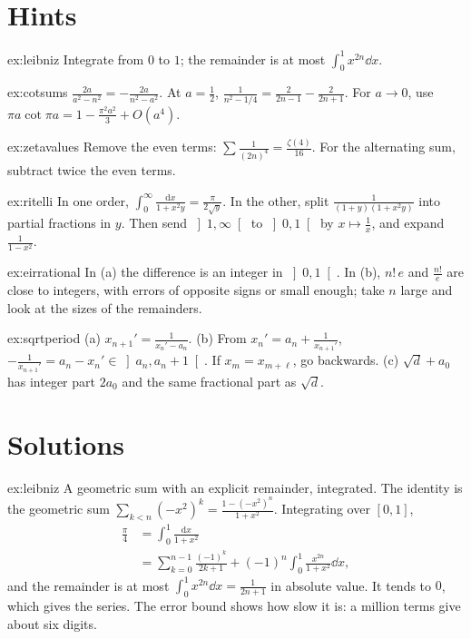 \section{Hints}

\begin{hint}{ex:leibniz}
Integrate from $0$ to $1$; the remainder is at most $\int_0^1x^{2n}\dd x$.
\end{hint}
\begin{hint}{ex:cotsums}
$\frac{2a}{a^2-n^2}=-\frac{2a}{n^2-a^2}$. At $a=\frac12$, $\frac1{n^2-1/4}=\frac2{2n-1}-\frac2{2n+1}$. For $a\to0$, use
$\pi a\cot\pi a=1-\frac{\pi^2a^2}3+O(a^4)$.
\end{hint}
\begin{hint}{ex:zetavalues}
Remove the even terms: $\sum\frac1{(2n)^4}=\frac{\zeta(4)}{16}$. For the alternating sum, subtract twice the even terms.
\end{hint}
\begin{hint}{ex:ritelli}
In one order, $\int_0^\infty\frac{\mathrm dx}{1+x^2y}=\frac\pi{2\sqrt y}$. In the other, split
$\frac1{(1+y)(1+x^2y)}$ into partial fractions in $y$. Then send $\left]1,\infty\right[$ to $\left]0,1\right[$ by $x\mapsto\frac1x$, and expand
$\frac1{1-x^2}$.
\end{hint}
\begin{hint}{ex:eirrational}
In (a) the difference is an integer in $\left]0,1\right[$. In (b), $n!\,e$ and $\frac{n!}e$ are close to integers, with errors of
opposite signs or small enough; take $n$ large and look at the sizes of the remainders.
\end{hint}
\begin{hint}{ex:sqrtperiod}
(a) $x_{n+1}'=\frac1{x_n'-a_n}$. (b) From $x_n'=a_n+\frac1{x_{n+1}'}$, $-\frac1{x_{n+1}'}=a_n-x_n'\in\left]a_n,a_n+1\right[$. If
$x_m=x_{m+\ell}$, go backwards. (c) $\sqrt d+a_0$ has integer part $2a_0$ and the same fractional part as $\sqrt d$.
\end{hint}

\section{Solutions}

\begin{solution}{ex:leibniz}
\idea A geometric sum with an explicit remainder, integrated.
\writeup The identity is the geometric sum $\sum_{k<n}(-x^2)^k=\frac{1-(-x^2)^n}{1+x^2}$. Integrating over $[0,1]$,
\[
\begin{aligned}\frac\pi4&=\int_0^1\frac{\mathrm dx}{1+x^2}\\&=\sum_{k=0}^{n-1}\frac{(-1)^k}{2k+1}+(-1)^n\int_0^1\frac{x^{2n}}{1+x^2}\dd x,\end{aligned}
\]
and the remainder is at most $\int_0^1x^{2n}\dd x=\frac1{2n+1}$ in absolute value. It tends to $0$, which gives the series. The
error bound shows how slow it is: a million terms give about six digits.
\end{solution}


